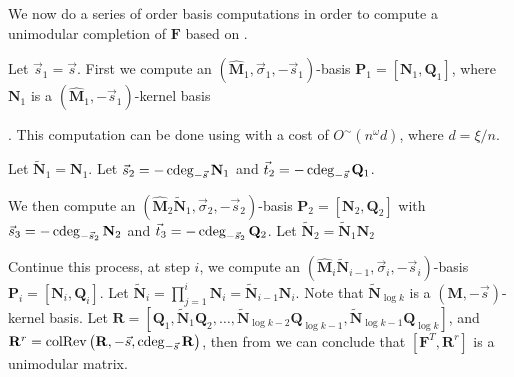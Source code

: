We now do a series of order basis computations in order to compute
a unimodular completion of $\mathbf{F}$ based on .

Let $\vec{s}_{1}=\vec{s}$. First we compute an $\left(\hat{\mathbf{M}}_{1},\vec{\sigma}_{1},-\vec{s}_{1}\right)$-basis
$\mathbf{P}_{1}=\left[\mathbf{N}_{1},\mathbf{Q}_{1}\right]$, where
$\mathbf{N}_{1}$ is a $\left(\hat{\mathbf{M}}_{1},-\vec{s}_{1}\right)$-kernel
basis%
\begin{comment}
 with $\cdeg_{-\vec{s}_{1}}\mathbf{N}_{1}\le0$
\end{comment}
. This computation can be done using  with a
cost of $O^{\sim}\left(n^{\omega}d\right)$, where $d=\xi/n$. 

Let $\tilde{\mathbf{N}}_{1}=\mathbf{N}_{1}$. Let $\vec{s}_{2}=-\cdeg_{-\vec{s}}\mathbf{N}_{1}$
and $\vec{t}_{2}=-\cdeg_{-\vec{s}}\mathbf{Q}_{1}$. %
\begin{comment}
Note that $-\vec{s}_{1}\le-[\vec{s}_{2},\vec{t}_{2}]\le\left[0,\dots,0,1,\dots1\right]$
component-wise, since $\mathbf{P}_{1}$ has lower order than any $\left(\mathbf{M}^{T},\vec{b}+\left[1,\dots,1\right],-\vec{s}\right)$-basis
$\mathbf{P}$ hence generates $\mathbf{P}$. Therefore, $\cdeg_{-\vec{s}}\mathbf{P}_{1}\le\cdeg_{-\vec{s}}\mathbf{P}\le\left[0,\dots,0,1,\dots1\right]$. 
\end{comment}
{} We then compute an $\left(\hat{\mathbf{M}}_{2}\tilde{\mathbf{N}}_{1},\vec{\sigma}_{2},-\vec{s}_{2}\right)$-basis
$\mathbf{P}_{2}=\left[\mathbf{N}_{2},\mathbf{Q}_{2}\right]$ with
$\vec{s}_{3}=-\cdeg_{-\vec{s}_{2}}\mathbf{N}_{2}$ and $\vec{t}_{3}=-\cdeg_{-\vec{s}_{2}}\mathbf{Q}_{2}$.
Let $\tilde{\mathbf{N}}_{2}=\tilde{\mathbf{N}}_{1}\mathbf{N}_{2}$
\begin{comment}
Let $\mathbf{R}_{1}=\left[\mathbf{N}_{1}\mathbf{Q}_{2},\mathbf{Q}_{1}\right]$
and $\mathbf{R}_{1}^{r}=\colRev\left(\mathbf{R}_{1},-\vec{s},\cdeg_{-\vec{s}}\mathbf{R}_{1}\right)$.
Then from \prettyref{lem:unimodularComputationByRows} we know $\left[\mathbf{F}^{T},\mathbf{R}_{1}^{r}\right]$
is a unimodular matrix.
\end{comment}


Continue this process, at step $i$, we compute an $\left(\hat{\mathbf{M}}_{i}\tilde{\mathbf{N}}_{i-1},\vec{\sigma}_{i},-\vec{s}_{i}\right)$-basis
$\mathbf{P}_{i}=\left[\mathbf{N}_{i},\mathbf{Q}_{i}\right]$. Let
$\tilde{\mathbf{N}}_{i}=\prod_{j=1}^{i}\mathbf{N}_{i}=\tilde{\mathbf{N}}_{i-1}\mathbf{N}_{i}$.
Note that $\tilde{\mathbf{N}}_{\log k}$ is a $\left(\mathbf{M},-\vec{s}\right)$-kernel
basis. Let $\mathbf{R}=\left[\mathbf{Q}_{1},\tilde{\mathbf{N}}_{1}\mathbf{Q}_{2},\dots,\tilde{\mathbf{N}}_{\log k-2}\mathbf{Q}_{\log k-1},\tilde{\mathbf{N}}_{\log k-1}\mathbf{Q}_{\log k}\right]$,
and $\mathbf{R}^{r}=\colRev\left(\mathbf{R},-\vec{s},\cdeg_{-\vec{s}}\mathbf{R}\right)$,
then from  we can conclude
that $\left[\mathbf{F}^{T},\mathbf{R}^{r}\right]$ is a unimodular
matrix. 

